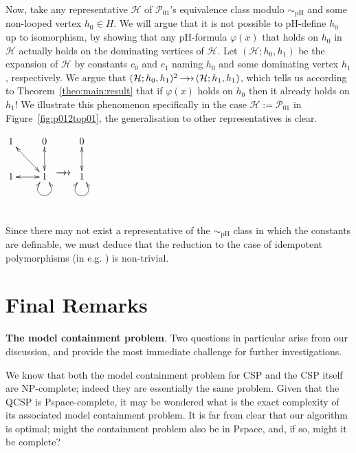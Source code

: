 \documentclass{LMCS}
\newcommand{\surhom}{
  \ensuremath{
      \negthinspace 
      \longrightarrow
      \hspace{-5mm} \rightarrow \hspace{1mm}
  }
}
\renewcommand{\phi}{\varphi}
\begin{document}
Now, take any representative $\mathcal{H}$ of $\mathcal{P}_{01}$'s equivalence class modulo $\sim_{\mathrm{pH}}$ and some non-looped vertex $h_0 \in H$. We will argue that it is not possible to pH-define $h_0$ up to isomorphism, by showing that any pH-formula $\phi(x)$ that holds on $h_0$ in $\mathcal{H}$ actually holds on the dominating vertices of $\mathcal{H}$. Let $(\mathcal{H};h_0,h_1)$ be the expansion of $\mathcal{H}$ by constants $c_0$ and $c_1$ naming $h_0$ and some dominating vertex $h_1$, respectively. We argue that $(\mathcal{H};h_0,h_1)^2 \surhom (\mathcal{H};h_1,h_1)$, which tells us according to Theorem~\ref{theo:main:result} that if $\phi(x)$ holds on $h_0$ then it already holds on $h_1$! We illustrate this phenomenon specifically in the case $\mathcal{H}:=\mathcal{P}_{01}$ in Figure~\ref{fig:p012top01}, the generalisation to other representatives is clear.
\begin{figure*}
  \centering
$
\xymatrix{
1  &
0  \\
1 &
1  \ar@{<->}[l] \ar@{<->}[u] \ar@{<->}[ul]  \ar@{<->}@(dl,dr) \\
\\
}
$ \hspace{1cm} $\xymatrix{\\ \surhom\\ \\}$ \hspace{1cm}
$
\xymatrix{
0  \ar@{<->}[d]  \\
1 \ar@{<->}@(dl,dr)  \\
}
$
  \caption{Surjective homomorphism from ${\mathcal{P}_{01}}^2$ to $\mathcal{P}_{01}$.}
  \label{fig:p012top01}
\end{figure*}
Since there may not exist a representative of the  $\sim_{\mathrm{pH}}$ class in which the constants are definable, we must deduce that the reduction to the case of idempotent polymorphisms (in \mbox{e.g.} \cite{chen-2006}) is non-trivial. 

\section{Final Remarks}

\textbf{The model containment problem}. Two questions in particular arise from our discussion, and provide the most immediate challenge for further investigations.

We know that both the model containment problem for CSP and the CSP itself are NP-complete; indeed they are essentially the same problem. Given that the QCSP is Pspace-complete, it may be wondered what is the exact complexity of its associated model containment problem. It is far from clear that our algorithm is optimal; might the containment problem also be in Pspace, and, if so, might it be complete?
\end{document}
